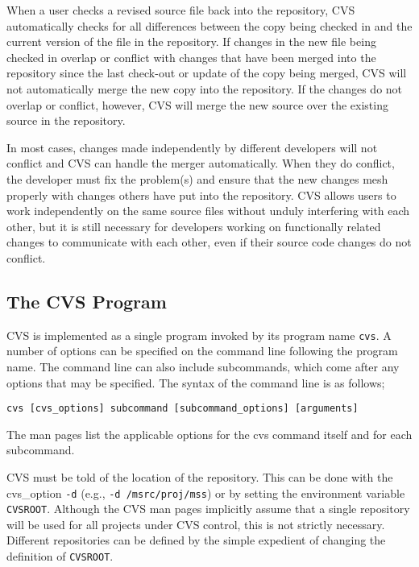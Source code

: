 When a user checks a revised source file back into the repository, 
CVS automatically checks for all differences between the copy being checked
in and the current version of the file in the repository.  If changes in
the new file being checked in overlap or conflict with changes that have
been merged into the repository since the last check-out or update of the
copy being merged, CVS will not automatically merge the new copy into the repository.
If the changes do not overlap or conflict, however, CVS will merge the new
source over the existing source in the repository.

In most cases, changes made
independently by different developers will not conflict and CVS can
handle the merger automatically.  When they do conflict, 
the developer must fix the problem(s) and ensure that the new changes
mesh properly with changes others have put into the repository.
CVS allows users to work independently on the same source files without
unduly interfering with each other, but it is still necessary for 
developers working on functionally related changes to communicate with
each other, even if their source code changes do not conflict. 

\subsection{The CVS Program}

CVS is implemented as a single program invoked by its program name {\tt cvs}.
A number of options can be specified on the command line following the
program name.  The command line can also include subcommands, which
come after any options that may be specified.  The syntax of the command
line is as follows;

\begin{verbatim}
cvs [cvs_options] subcommand [subcommand_options] [arguments]
\end{verbatim}

The man pages list the
applicable options for the cvs command itself and for each subcommand.

CVS must be told of the location of the repository.  This can be done
with the cvs\_option {\tt -d} (e.g., {\tt -d /msrc/proj/mss}) or by setting
the environment variable {\tt CVSROOT}.  Although the CVS man pages
implicitly assume that a single repository will be used 
for all projects under CVS control,
this is not strictly necessary.  Different repositories can be defined
by the simple expedient of changing the definition of {\tt CVSROOT}.

